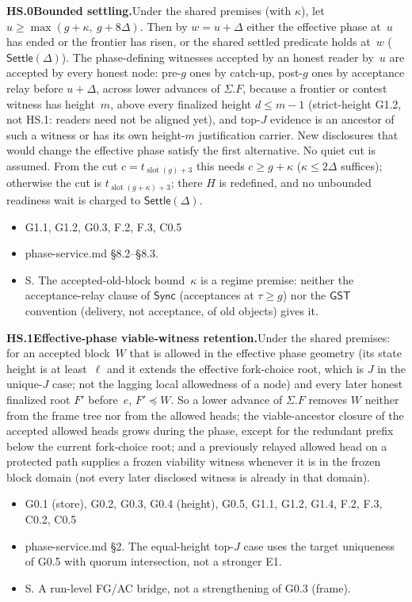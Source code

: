 \documentclass{article}
\newcommand{\slot}{\operatorname{slot}}
\newcommand{\dagnode}[6]{%
\par\medskip\noindent\textbf{#1\enspace #2.}\enspace #3
\begin{itemize}[leftmargin=2.2em,itemsep=0pt,topsep=2pt]
\item[\emph{Uses}] #4
\item[\emph{Evid.}] #5
\item[\emph{Task}] #6
\end{itemize}}
\begin{document}
\dagnode{HS.0}{Bounded settling}{Under the shared premises (with $\kappa$),
let $u\geq\max(g+\kappa,\ g+8\Delta)$.  Then by $w=u+\Delta$ either the
effective phase at~$u$ has ended or the frontier has risen, or the shared
settled predicate holds at~$w$ ($\mathsf{Settle}(\Delta)$).  The phase-defining
witnesses accepted by an honest reader by~$u$ are accepted by every honest
node: pre-$g$ ones by
catch-up, post-$g$ ones by acceptance relay before $u+\Delta$, across lower
advances of $\Sigma.F$, because a frontier or contest witness has height~$m$,
above every finalized height $d\leq m-1$ (strict-height G1.2, not HS.1:
readers need not be aligned yet), and top-$J$ evidence is an ancestor of such
a witness or has its own height-$m$ justification carrier.  New disclosures
that would change the effective phase satisfy the first alternative.  No quiet
cut is assumed.  From the cut $c=t_{\slot(g)+3}$ this needs $c\geq g+\kappa$
($\kappa\leq2\Delta$ suffices); otherwise the cut is
$t_{\slot(g+\kappa)+3}$; there $H$ is redefined, and no unbounded readiness
wait is charged to $\mathsf{Settle}(\Delta)$.}
{G1.1, G1.2, G0.3, F.2, F.3, C0.5}{phase-service.md \S8.2--\S8.3.}{S.  The
accepted-old-block bound~$\kappa$ is a regime premise: neither the
acceptance-relay clause of $\mathsf{Sync}$ (acceptances at $\tau\geq g$) nor
the $\mathsf{GST}$ convention (delivery, not acceptance, of old objects)
gives it.}

\dagnode{HS.1}{Effective-phase viable-witness retention}{Under the shared
premises: for an accepted block~$W$ that is allowed in the effective phase
geometry (its state height is at least~$\ell$ and it extends the effective
fork-choice root, which is $J$ in the unique-$J$ case; not the lagging local
allowedness of a node) and every later honest finalized root $F'$ before~$e$,
$F'\preceq W$.  So a lower advance of $\Sigma.F$ removes $W$ neither from the
frame tree nor from the allowed heads; the viable-ancestor closure of the
accepted allowed heads grows during the phase, except for the redundant
prefix below the current fork-choice root; and a previously relayed allowed
head on a protected path supplies a frozen viability witness whenever it is
in the frozen block domain (not every later disclosed witness is already in
that domain).}
{G0.1 (store), G0.2, G0.3, G0.4 (height), G0.5, G1.1, G1.2, G1.4, F.2, F.3,
C0.2, C0.5}{phase-service.md \S2.  The equal-height top-$J$ case uses the
target uniqueness of G0.5 with quorum intersection, not a stronger E1.}{S.  A
run-level FG/AC bridge, not a strengthening of G0.3 (frame).}
\end{document}
